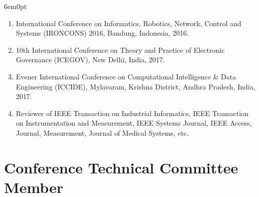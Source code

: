 \documentclass[11pt,a4paper]{moderncv}
\begin{document}
\begin{adjustwidth}{6em}{0pt}
\begin{enumerate}
		\item International Conference on Informatics, Robotics, Network, Control and Systems (IRONCONS) 2016, Bandung, Indonesia, 2016.
		
		\item 10th International Conference on Theory and Practice of Electronic Governance (ICEGOV), New Delhi, India, 2017.
		
		\item Evener International Conference on Computational Intelligence \& Data Engineering (ICCIDE), Mylavaram, Krishna District, Andhra Pradesh, India, 2017.
		
		\item Reviewer of IEEE Transaction on Industrial Informatics, IEEE Transaction on Instrumentation and Measurement, IEEE Systems Journal, IEEE Access, Journal, Measurement, Journal of Medical Systems, etc.
		
		
	\end{enumerate}
\end{adjustwidth}




\section{\textbf{Conference Technical Committee Member}}
\end{document}
